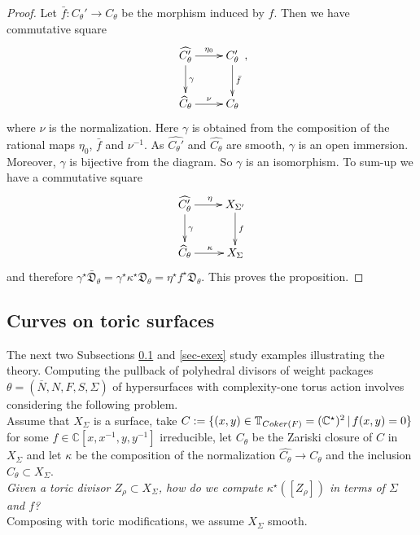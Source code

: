\documentclass[11pt, reqno]{amsart}
\theoremstyle{plain}
\theoremstyle{definition}
\theoremstyle{remark}
\begin{document}
\begin{proof}
Let $\bar{f}: C_{\theta}'\rightarrow C_{\theta}$
be the morphism induced by $f$. Then we have commutative 
square
 $$\xymatrix{ \widehat{C_{\theta}'}  \ar[r]^{\eta_{0}} \ar[d] ^{\gamma} & C_{\theta}' \ar[d]^{\bar{f}}\\   \widehat{C}_{\theta} \ar[r]^{\nu} & C_{\theta}},$$ 
 where $\nu$ is the normalization. Here $\gamma$ is obtained from the composition
 of the rational maps $\eta_{0}$, $\bar{f}$ and $\nu^{-1}$. As $\widehat{C_{\theta}'}$ and $\widehat{C_{\theta}}$ are smooth,
 $\gamma$ is an open immersion. Moreover, $\gamma$ is bijective from the diagram. So $\gamma$ is an isomorphism. 
 To sum-up we have a commutative square
 $$\xymatrix{ \widehat{C_{\theta}'}  \ar[r]^{\eta} \ar[d] ^{{\gamma}} & X_{\Sigma'} \ar[d]^{f}\\   \widehat{C}_{\theta} \ar[r]^{\kappa} & X_{\Sigma}}$$ 
 and therefore $\gamma^{\star}\bar{\mathfrak{D}}_{\theta} =  \gamma^{\star}\kappa^{\star}\mathfrak{D}_{\theta} =  \eta^{\star} f^{\star} \mathfrak{D}_{\theta}$. This proves the proposition. 
\end{proof}


\subsection{Curves on toric surfaces}\label{SEC-CurveToricsURF}
The next two Subsections \ref{SEC-CurveToricsURF} and \ref{sec-exex} study examples illustrating the
theory. Computing the pullback of polyhedral divisors of weight packages $\theta =  (\overline{N}, N, F, S, \Sigma)$
of hypersurfaces with complexity-one torus action involves considering the following 
problem. 
\\

Assume that $X_{\Sigma}$ is a surface, take
$C :=  \{(x, y)\in \mathbb{T}_{{\rm Coker}(F)} =  (\mathbb{C}^{\star})^{2} \,|\, f(x, y) =  0\}$
for some $f\in \mathbb{C}[x, x^{-1}, y, y^{-1}]$ irreducible, 
let $C_{\theta}$ be the  Zariski closure of $C$ in $X_{\Sigma}$ and  let $\kappa$ be the composition of the normalization $ \widehat{C_{\theta}}\rightarrow C_{\theta}$ and the inclusion
$ C_{\theta}\subset X_{\Sigma}$. \\

 \emph{Given a
toric divisor $Z_{\rho}\subset X_{\Sigma}$, how do we compute $\kappa^{\star}([Z_{\rho}])$ in terms of $\Sigma$ and $f$?}
\\

Composing with toric modifications, we assume $X_{\Sigma}$ smooth.
\end{document}

